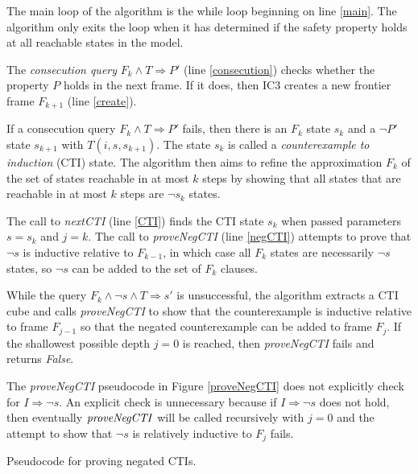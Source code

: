 \documentclass[12pt,a4paper,twoside,openright]{report}
\begin{document}
{{The main loop of the algorithm is the while loop beginning on line \ref{main}.
The algorithm only exits the loop when it has determined if the
safety property holds at all reachable states in the model.

The \emph{consecution query} $F_k \wedge T \Rightarrow P'$ (line \ref{consecution})
checks whether the property $P$ holds in the next
frame. If it does, then IC3 creates a new
frontier frame $F_{k + 1}$ (line \ref{create}).

If a consecution query $F_k \wedge T \Rightarrow P'$ fails, then
there is an $F_k$ state $s_k$ and a $\neg P'$ state $s_{k + 1}$ with $T(i,s,s_{k + 1})$.
The state $s_k$ is called a \emph{counterexample to induction} (CTI) state.
The algorithm then aims to refine the approximation $F_k$ of the set of states
reachable in at most $k$ steps by showing that all states that are
reachable in at most $k$ steps are $\neg s_k$ states.

The call to {\it nextCTI} (line \ref{CTI}) finds the CTI
state $s_k$ when passed parameters $s = s_k$ and $j = k$.
The call to {\it proveNegCTI} (line \ref{negCTI})
attempts to prove that $\neg s$ is inductive relative to $F_{k - 1}$,
in which case all $F_k$ states are necessarily $\neg s$ states, so $\neg s$ can
be added to the set of $F_k$ clauses.

While the query
$F_k \wedge \neg s \wedge T \Rightarrow s'$ is unsuccessful,
the algorithm extracts a CTI cube and
calls {\it proveNegCTI} to show that the counterexample is
inductive relative to frame $F_{j - 1}$ so that the negated
counterexample can be added to frame $F_j$.
If the shallowest possible depth $j = 0$ is reached, then
{\it proveNegCTI} fails and returns {\it False}.

The {\it proveNegCTI} pseudocode in Figure \ref{proveNegCTI}
does not explicitly check for $I \Rightarrow
\neg s$. An explicit check is unnecessary because if
$I \Rightarrow \neg s$ does not hold, then eventually ${\it proveNegCTI}$
will be called recursively with $j = 0$ and the attempt to show that
$\neg s$ is relatively inductive to $F_j$ fails.

\begin{algorithm}[t]
\DontPrintSemicolon
{}
\caption{Pseudocode for proving negated CTIs.}
\label{proveNegCTI}
\end{algorithm}

}}
\end{document}
